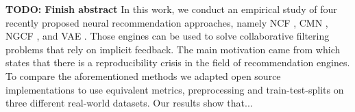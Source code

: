 \textbf{TODO: Finish abstract}
In this work, we conduct an empirical study of four recently proposed neural recommendation approaches, namely NCF \cite{he2017neural}, CMN \cite{ebesu2018collaborative}, NGCF \cite{wang2019neural}, and VAE \cite{liang2018variational}. Those engines can be used to solve collaborative filtering problems that rely on implicit feedback. The main motivation came from \cite{dacrema2019we} which states that there is a reproducibility crisis in the field of recommendation engines. To compare the aforementioned methods we adapted open source implementations to use equivalent metrics, preprocessing and train-test-splits on three different real-world datasets. Our results show that...
